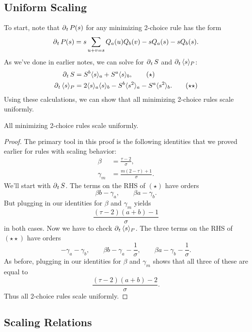 \documentclass[twoside,10pt]{article}
\begin{document}
\subsection{Uniform Scaling}

To start, note that $\operatorname{\partial}_{t}{P(s)} $ for any minimizing 2-choice rule has the form
\[
	\operatorname{\partial}_{t}{P(s)} = s \sum_{u+v=s} Q_a(u) Q_b(v) - s Q_a(s) - s Q_b(s).
\] As we've done in earlier notes, we can solve for $\operatorname{\partial}_{t}{S} $ and $\operatorname{\partial}_{t}{\langle s \rangle_{P}} $:
\begin{align*}
	\operatorname{\partial}_{t}{S} &= S^{b}\langle s \rangle_{a} + S^{a}\langle s \rangle_{b}, \tag{$\star$} \\
	\operatorname{\partial}_{t}{\langle s \rangle_{P}} &= 2 \langle s \rangle_{a}\langle s \rangle_{b} - S^{b}\langle s^{2} \rangle_{a} - S^{a}\langle s^{2} \rangle_{b}. \tag{$\star\star$}
\end{align*}
Using these calculations, we can show that all minimizing 2-choice rules scale uniformly.
\begin{prop}
All minimizing 2-choice rules scale uniformly.
\end{prop}
\begin{proof}
	The primary tool in this proof is the following identities that we proved earlier for rules with scaling behavior:
	\begin{align*}
		\beta &= \frac{\tau-2}{\sigma},\\
		\gamma_{m} &= \frac{m(2-\tau)+1}{\sigma} .
	\end{align*}
	We'll start with $\operatorname{\partial}_{t}{S}$. The terms on the RHS of $(\star)$ have orders
	\[
	\beta b - \gamma_{a}, \quad\quad \beta a - \gamma_{b}.
	\] But plugging in our identities for $\beta$ and $\gamma_{m}$ yields 
	\[
		\frac{(\tau-2)(a+b) - 1}{\sigma} 
	\] in both cases. Now we have to check $\operatorname{\partial}_{t}{\langle s \rangle_{P}}$. The three terms on the RHS of $(\star\star)$ have orders
	\[
	-\gamma_{a}-\gamma_{b}, \quad\quad \beta b - \gamma_{a} - \frac{1}{\sigma} , \quad\quad \beta a - \gamma_{b} - \frac{1}{\sigma} .
	\] As before, plugging in our identities for $\beta$ and $\gamma_{m}$ shows that all three of these are equal to
	\[
		\frac{(\tau-2)(a+b) - 2}{\sigma} .
	\] Thus all 2-choice rules scale uniformly.
\end{proof}

\subsection{Scaling Relations}
\end{document}
